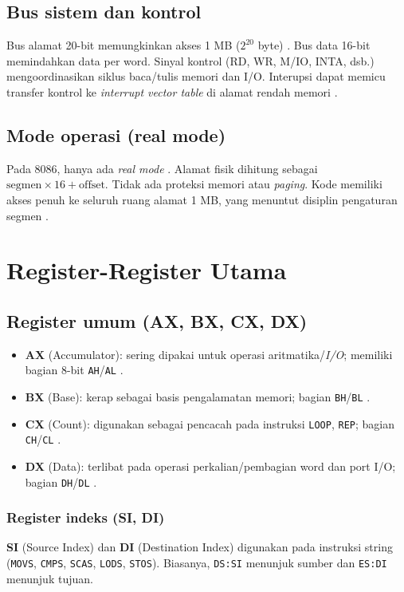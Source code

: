 \subsection{Bus sistem dan kontrol}
Bus alamat 20-bit memungkinkan akses 1 MB (\(2^{20}\) byte) \cite{intel2019manual32}. Bus data 16-bit memindahkan data per word. Sinyal kontrol (RD, WR, M/IO, INTA, dsb.) mengoordinasikan siklus baca/tulis memori dan I/O. Interupsi dapat memicu transfer kontrol ke \textit{interrupt vector table} di alamat rendah memori \cite{brey1986mikroprosesor}.

\subsection{Mode operasi (real mode)}
Pada 8086, hanya ada \textit{real mode} \cite{intel2019manual32}. Alamat fisik dihitung sebagai \(\text{segmen} \times 16 + \text{offset}\). Tidak ada proteksi memori atau \textit{paging}. Kode memiliki akses penuh ke seluruh ruang alamat 1 MB, yang menuntut disiplin pengaturan segmen \cite{brey1986mikroprosesor}.

\section{Register-Register Utama}
\subsection{Register umum (AX, BX, CX, DX)}
\begin{itemize}
    \item \textbf{AX} (Accumulator): sering dipakai untuk operasi aritmatika/\textit{I/O}; memiliki bagian 8-bit \texttt{AH}/\texttt{AL} \cite{intel2019manual32}.
    \item \textbf{BX} (Base): kerap sebagai basis pengalamatan memori; bagian \texttt{BH}/\texttt{BL} \cite{brey1986mikroprosesor}.
    \item \textbf{CX} (Count): digunakan sebagai pencacah pada instruksi \texttt{LOOP}, \texttt{REP}; bagian \texttt{CH}/\texttt{CL} \cite{hyde2010art}.
    \item \textbf{DX} (Data): terlibat pada operasi perkalian/pembagian word dan port I/O; bagian \texttt{DH}/\texttt{DL} \cite{susanto1995belajar}.
\end{itemize}

\subsubsection{Register indeks (SI, DI)}
\textbf{SI} (Source Index) dan \textbf{DI} (Destination Index) digunakan pada instruksi string (\texttt{MOVS}, \texttt{CMPS}, \texttt{SCAS}, \texttt{LODS}, \texttt{STOS}). Biasanya, \texttt{DS:SI} menunjuk sumber dan \texttt{ES:DI} menunjuk tujuan.

